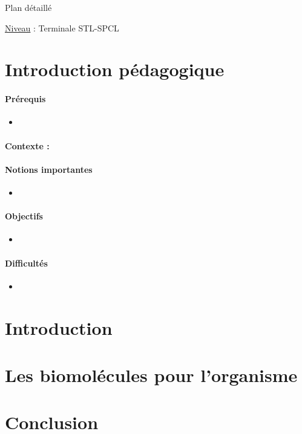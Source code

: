 \begin{reportBlock}{Plan détaillé}

\underline{Niveau} : Terminale STL-SPCL \\

\section*{Introduction pédagogique}


\paragraph*{Prérequis}
\begin{itemize}
\item 
\end{itemize}
\paragraph*{Contexte :}


\paragraph*{Notions importantes}

\begin{itemize}
\item 
\end{itemize}

\paragraph*{Objectifs}

\begin{itemize}
\item 
\end{itemize}

\paragraph*{Difficultés}

\begin{itemize}
\item 
\end{itemize}

\section*{Introduction }

\section{Les biomolécules pour l'organisme}

\section{Conclusion} 

\end{reportBlock}